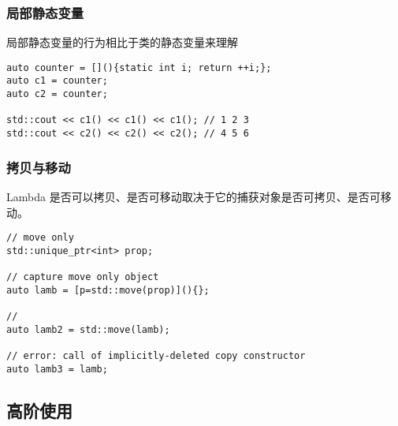 \documentclass{article}
\begin{document}
\subsubsection{局部静态变量}
局部静态变量的行为相比于类的静态变量来理解
\begin{verbatim}
auto counter = [](){static int i; return ++i;};
auto c1 = counter;
auto c2 = counter;

std::cout << c1() << c1() << c1(); // 1 2 3
std::cout << c2() << c2() << c2(); // 4 5 6 
\end{verbatim}


\subsubsection{拷贝与移动}
Lambda 是否可以拷贝、是否可移动取决于它的捕获对象是否可拷贝、是否可移动。
\begin{verbatim}
// move only 
std::unique_ptr<int> prop;

// capture move only object
auto lamb = [p=std::move(prop)](){};

// 
auto lamb2 = std::move(lamb);

// error: call of implicitly-deleted copy constructor
auto lamb3 = lamb; 
\end{verbatim}


\subsection{高阶使用}

\end{document}
